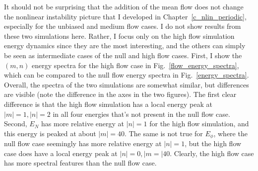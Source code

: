 It should not be surprising that the addition of the mean flow does not change the nonlinear instability picture that I developed in Chapter~\ref{c_nlin_periodic}, especially for the unbiased
and medium flow cases. I do not show results from these two simulations here. Rather, I focus only on the high flow simulation energy dynamics since they are the most interesting,
and the others can simply be seen as intermediate cases of the null and high flow cases. First, I show the $(m,n)$ energy spectra for the high flow case in Fig.~\ref{flow_energy_spectra},
which can be compared to the null flow energy spectra in Fig.~\ref{energy_spectra}. Overall, the spectra of the two simulations are somewhat similar, but differences are visible (note
the difference in the axes in the two figures).
The first clear difference is that the high flow simulation has a local energy peak at $|m|=1,|n|=2$ in all four energies that's not present in the null flow case. 
Second, $E_N$ has more relative energy at $|n|=1$ for the high flow simulation, and this energy
is peaked at about $|m|=40$. The same is not true for $E_\phi$, where the null flow case seemingly has more relative energy at $|n|=1$, but the high flow case does have a local energy peak at
$|n|=0,|m=|40$. Clearly, the high flow case has more spectral features than the null flow case.

